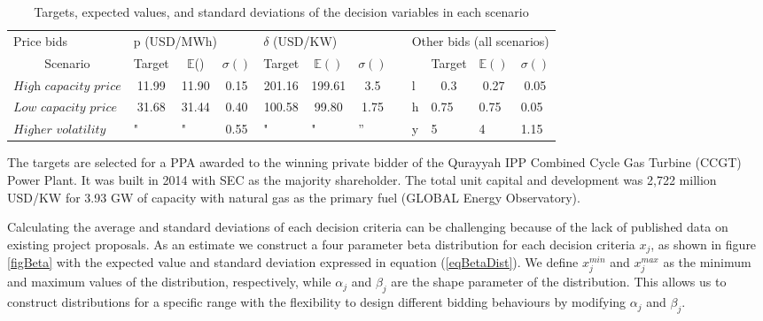 \documentclass[informs]{informs3}
\begin{document}
\begin{table}%
\caption {Targets, expected values, and standard deviations of the decision variables in each scenario } \label{tableScenarios}
\begin{tabular}{@{}lcccccclllll@{}}
\cmidrule(r){1-7} \cmidrule(l){9-12}
Price bids                     & \multicolumn{3}{l}{p (USD/MWh)}                            & \multicolumn{3}{l}{$\delta$ (USD/KW)}                                  &  & \multicolumn{4}{l}{Other bids (all scenarios)}                                                       \\ \cmidrule(r){1-7} \cmidrule(l){9-12} 
\multicolumn{1}{c}{Scenario}   & Target                & $\mathbb{E}$()        & $\sigma()$ & Target                & $\mathbb{E}()$        & $\sigma()$             &  &   & \multicolumn{1}{c}{Target} & \multicolumn{1}{c}{$\mathbb{E}()$} & \multicolumn{1}{c}{$\sigma()$} \\
$\textit{High capacity price}$ & 11.99                 & 11.90                 & 0.15       & 201.16                & 199.61                & 3.5                  &  & l & \multicolumn{1}{c}{0.3}    & \multicolumn{1}{c}{0.27}           & \multicolumn{1}{c}{0.05}       \\
$\textit{Low capacity price}$  & 31.68                & 31.44                & 0.40       & 100.58               & 99.80                & 1.75                &  & h & 0.75                       & 0.75                               & 0.05                           \\
$\textit{Higher volatility}$  & \multicolumn{1}{l}{"} & \multicolumn{1}{l}{"} & 0.55       & \multicolumn{1}{l}{"} & \multicolumn{1}{l}{"} & \multicolumn{1}{l}{''} &  & y & 5                          & 4                                  & 1.15                           \\ \cmidrule(r){1-7} \cmidrule(l){9-12} 
\end{tabular}
\end{table}

The targets are selected for a PPA awarded to the winning private bidder of the Qurayyah IPP Combined Cycle Gas Turbine (CCGT) Power Plant. It was built in 2014 with SEC as the majority shareholder. The total unit capital and development was 2,722 million USD/KW for 3.93 GW of capacity with natural gas as the primary fuel (GLOBAL Energy Observatory).

Calculating the average and standard deviations of each decision criteria can be challenging because of the lack of published data on existing project proposals. As an estimate  we construct a four parameter beta distribution for each decision criteria $x_j$, as shown in figure \ref{figBeta}  with the expected value and standard deviation expressed in equation (\ref{eqBetaDist}). We define $x_j^{min}$ and $x_j^{max}$ as the minimum and maximum values of the distribution, respectively, while $\alpha_j$ and $\beta_j$ are the shape parameter of the distribution. This allows us to construct distributions for  a specific range with the flexibility to design different bidding behaviours by modifying $\alpha_j$ and $\beta_j$.
\end{document}
